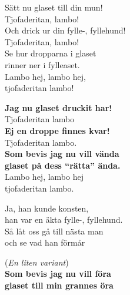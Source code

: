 \vspace{10pt}
Sätt nu glaset till din mun!\\
Tjofaderitan, lambo!\\
Och drick ur din fylle-, fyllehund!\\
Tjofaderitan, lambo!\\
Se hur dropparna i glaset\\
rinner ner i fylleaset.\\
Lambo hej, lambo hej, \\
tjofaderitan lambo!\par
\vspace{10pt}
\textbf{Jag nu glaset druckit har!}\\
Tjofaderitan lambo\\
\textbf{Ej en droppe finnes kvar!}\\
Tjofaderitan lambo.\\
\textbf{Som bevis jag nu vill vända\\
glaset på dess ``rätta'' ända.}\\
Lambo hej, lambo hej\\
tjofaderitan lambo.\par
\vspace{10pt}
Ja, han kunde konsten,\\
han var en äkta fylle-, fyllehund.\\
Så låt oss gå till nästa man\\
och se vad han förmår\par
\vspace{10pt}
(\textit{En liten variant})\\
\textbf{Som bevis jag nu vill föra\\
glaset till min grannes öra}
